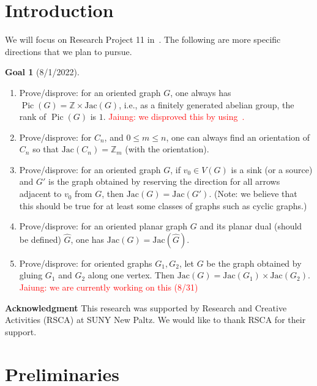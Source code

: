 \documentclass[11pt,reqno]{amsart}
\DeclareMathOperator{\Pic}{Pic}
\newcommand{\Jac}{\textrm{Jac}}{}
\theoremstyle{definition}
\newtheorem*{goal}{\textbf{Goal}}
\theoremstyle{plain}
\begin{document}
\maketitle


\section{Introduction}

	We will focus on Research Project 11 in~\cite{glass2020chip}.
	The following are more specific directions that we plan to pursue.

	\begin{goal}[8/1/2022]$ $
		\begin{enumerate}
			\item
			Prove/disprove: for an oriented graph $G$, one always has $\Pic(G)=\mathbb{Z} \times \Jac(G)$, 
			i.e., as a finitely generated abelian group, the rank of $\Pic(G)$ is $1$.
			\textcolor{red}{Jaiung: we disproved this by using~\cite{wagner2000critical}.}
			\item
			Prove/disprove: for $C_n$, and $0 \leq m \leq n$, one can always find an orientation
			of $C_n$ so that $\Jac(C_n)=\mathbb{Z}_m$ (with the orientation).
			\item
			Prove/disprove: for an oriented graph $G$, if $v_0 \in V(G)$ is a sink (or a source)
			and $G'$ is the graph obtained by reserving the direction for all arrows adjacent
			to $v_0$ from $G$, then $\Jac(G)=\Jac(G')$. (Note: we believe that this should be true
			for at least some classes of graphs such as cyclic graphs.)
			\item
			Prove/disprove: for an oriented planar graph $G$ and its planar dual (should be defined)
			$\hat{G}$, one has $\Jac(G)=\Jac(\hat{G})$.
			\item
			Prove/disprove: for oriented graphs $G_1,G_2$, let $G$ be the graph obtained by
			gluing $G_1$ and $G_2$ along one vertex. Then $\Jac(G)=\Jac(G_1) \times \Jac(G_2)$.
			\textcolor{red}{Jaiung: we are currently working on this (8/31)}
		\end{enumerate}
	\end{goal}

\bigskip

\textbf{Acknowledgment}\hspace{0.1cm} This research was supported by Research and Creative Activities (RSCA) at
	SUNY New Paltz. We would like to thank RSCA for their support.

\section{Preliminaries}
\end{document}
